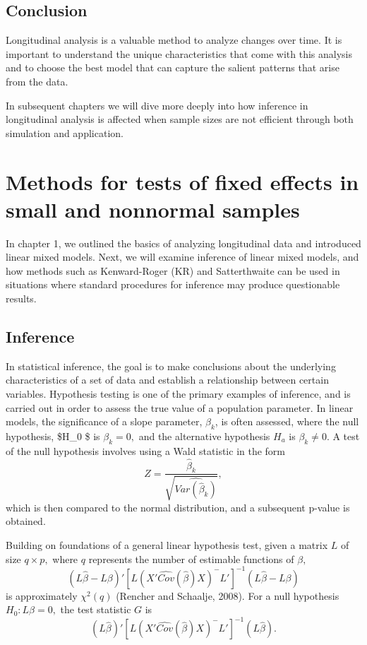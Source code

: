 \documentclass[12pt, twoside]{amherstthesis}
\begin{document}
\hypertarget{conclusion}{%
\section{Conclusion}\label{conclusion}}

Longitudinal analysis is a valuable method to analyze changes over time. It is important to understand the unique characteristics that come with this analysis and to choose the best model that can capture the salient patterns that arise from the data.

In subsequent chapters we will dive more deeply into how inference in longitudinal analysis is affected when sample sizes are not efficient through both simulation and application.

\hypertarget{rmd-basics}{%
\chapter{Methods for tests of fixed effects in small and nonnormal samples}\label{rmd-basics}}

In chapter 1, we outlined the basics of analyzing longitudinal data and introduced linear mixed models. Next, we will examine inference of linear mixed models, and how methods such as Kenward-Roger (KR) and Satterthwaite can be used in situations where standard procedures for inference may produce questionable results.

\hypertarget{inference}{%
\section{Inference}\label{inference}}

In statistical inference, the goal is to make conclusions about the underlying characteristics of a set of data and establish a relationship between certain variables. Hypothesis testing is one of the primary examples of inference, and is carried out in order to assess the true value of a population parameter. In linear models, the significance of a slope parameter, \(\beta_k\), is often assessed, where the null hypothesis, \$H\_0 \$ is \(\beta_k = 0,\) and the alternative hypothesis \(H_a\) is \(\beta_k \neq 0.\) A test of the null hypothesis involves using a Wald statistic in the form \[ Z = \frac{\hat\beta_k}{\sqrt{\hat{Var(\hat\beta_k)}}},\] which is then compared to the normal distribution, and a subsequent p-value is obtained.

Building on foundations of a general linear hypothesis test, given a matrix \(L\) of size \(q \times p,\) where \(q\) represents the number of estimable functions of \(\beta,\) \[(L\hat\beta-L\beta)'[L(X'\widehat {Cov}(\hat\beta)X)^-L']^{-1}(L\hat\beta-L\beta)
\] is approximately \(\chi^2(q)\) (Rencher and Schaalje, 2008). For a null hypothesis \(H_0: L\beta = 0,\) the test statistic \(G\) is \[(L\hat\beta)'[L(X'\widehat {Cov}(\hat\beta)X)^-L']^{-1}(L\hat\beta).\]
\end{document}
